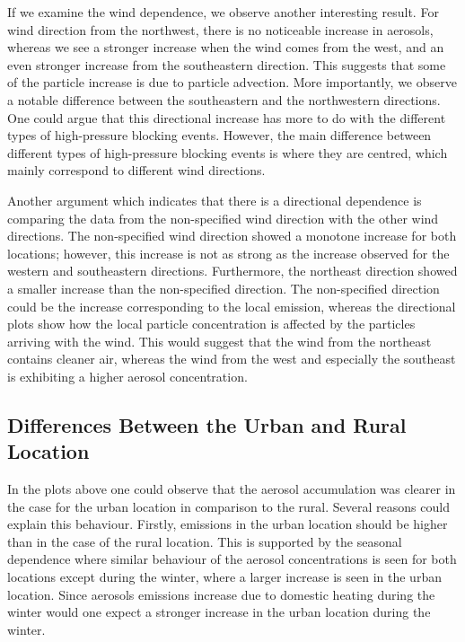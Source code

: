 If we examine the wind dependence, we observe another interesting result. For wind direction from the northwest, there is no noticeable increase in aerosols, whereas we see a stronger increase when the wind comes from the west, and an even stronger increase from the southeastern direction. This suggests that some of the particle increase is due to particle advection. More importantly, we observe a notable difference between the southeastern and the northwestern directions. One could argue that this directional increase has more to do with the different types of high-pressure blocking events. However, the main difference between different types of high-pressure blocking events is where they are centred, which mainly correspond to different wind directions. 

Another argument which indicates that there is a directional dependence is comparing the data from the non-specified wind direction with the other wind directions. The non-specified wind direction showed a monotone increase for both locations; however, this increase is not as strong as the increase observed for the western and southeastern directions. Furthermore, the northeast direction showed a smaller increase than the non-specified direction. The non-specified direction could be the increase corresponding to the local emission, whereas the directional plots show how the local particle concentration is affected by the particles arriving with the wind. This would suggest that the wind from the northeast contains cleaner air, whereas the wind from the west and especially the southeast is exhibiting a higher aerosol concentration. 

\subsection{Differences Between the Urban and Rural Location}
In the plots above one could observe that the aerosol accumulation was clearer in the case for the urban location in comparison to the rural. Several reasons could explain this behaviour. Firstly, emissions in the urban location  should be higher than in the case of the rural location. This is supported by the seasonal dependence where similar behaviour of the aerosol concentrations is seen for both locations except during the winter, where a larger increase is seen in the urban location. Since aerosols emissions increase due to domestic heating during the winter would one expect a stronger increase in the urban location during the winter. 

